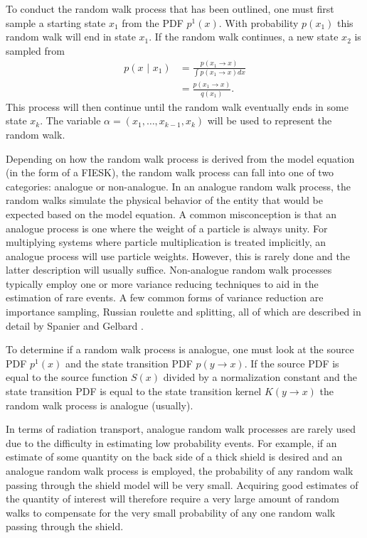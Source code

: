 To conduct the random walk process that has been outlined, one must first 
sample a starting state $x_1$ from the PDF $p^1(x)$. With probability $p(x_1)$ 
this random walk will end in state $x_1$. If the random walk continues, a new 
state $x_2$ is sampled from
\begin{align}
  p(x \text{ | } x_1) & = \frac{p(x_1 \to x)}{\int p(x_1 \to x)dx} \nonumber \\
  & = \frac{p(x_1 \to x)}{q(x_1)}.
\end{align}
This process will then continue until the random walk eventually ends in some 
state $x_k$. The variable $\alpha = (x_1,\ldots,x_{k-1},x_k)$ will be used to 
represent the random walk. 

Depending on how the random walk process is derived from the model equation (in
the form of a FIESK), the random walk process can fall into one of two 
categories: analogue or non-analogue. In an analogue random walk process, the 
random walks simulate the physical behavior of the entity that would be 
expected based on the model equation. A common misconception is that an 
analogue process is one where the weight of a particle is always unity. For 
multiplying systems where particle multiplication is treated implicitly, an 
analogue process will use particle weights. However, this is rarely done and 
the latter description will usually suffice. Non-analogue random walk processes 
typically employ one or more variance reducing techniques to aid in the 
estimation of rare events. A few common forms of variance reduction are 
importance sampling, Russian roulette and splitting, all of which are 
described in detail by Spanier and Gelbard \citet{spanier_monte_1969}. 

To determine if a random walk process is analogue, one must look at the source 
PDF $p^1(x)$ and the state transition PDF $p(y \to x)$. If the source PDF is 
equal to the source function $S(x)$ divided by a normalization constant and the 
state transition PDF is equal to the state transition kernel $K(y \to x)$ the 
random walk process is analogue (usually).

In terms of radiation transport, analogue random walk processes are 
rarely used due to the difficulty in estimating low probability events. For
example, if an estimate of some quantity on the back side of a thick shield is 
desired and an analogue random walk process is employed, the probability of any 
random walk passing through the shield model will be very small. Acquiring good
estimates of the quantity of interest will therefore require a very large
amount of random walks to compensate for the very small probability of any one
random walk passing through the shield. 

